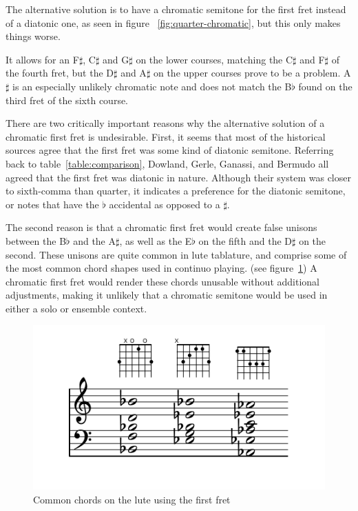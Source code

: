 The alternative solution is to have a chromatic semitone for the first fret instead of a
diatonic one, as seen in figure ~\ref{fig:quarter-chromatic}, but this only makes things
worse.

It allows for an F$\sharp$, C$\sharp$ and G$\sharp$ on the lower courses, matching the
C$\sharp$ and F$\sharp$ of the fourth fret, but the D$\sharp$ and A$\sharp$ on the
upper courses prove to be a problem. A$\sharp$ is an especially unlikely chromatic
note and does not match the B$\flat$ found on the third fret of the sixth course.

There are two critically important reasons why the alternative solution of a chromatic first fret is undesirable. First,
it seems that most of the historical sources agree that the first fret was some kind of diatonic semitone. Referring
back to table~\ref{table:comparison}, Dowland, Gerle, Ganassi, and Bermudo all agreed that the first fret was diatonic
in nature. Although their system was closer to sixth-comma than quarter, it indicates a preference for the diatonic
semitone, or notes that have the $\flat$ accidental as opposed to a $\sharp$.

The second reason is that a chromatic first fret would create false unisons between the B$\flat$ and the A$\sharp$, as
well as the E$\flat$ on the fifth and the D$\sharp$ on the second. These unisons are quite common in lute tablature, and
comprise some of the most common chord shapes used in continuo playing. (see figure~\ref{first-fret-lute-chords}) A
chromatic first fret would render these chords unusable without additional adjustments, making it unlikely that a
chromatic semitone would be used in either a solo or ensemble context.

\begin{figure}[h]
\centering
\includegraphics{examples/first-fret-lute-chords.pdf}
\caption{Common chords on the lute using the first fret}
\label{first-fret-lute-chords}
\end{figure}

